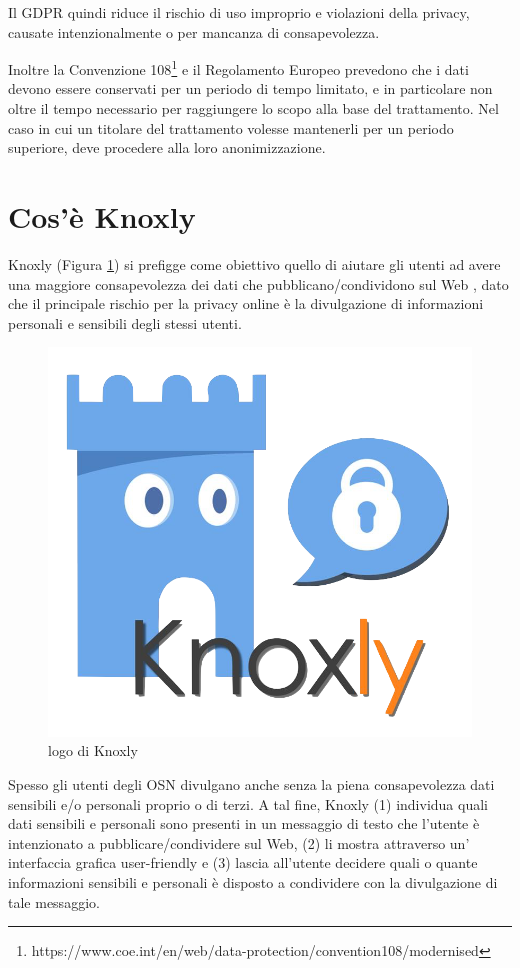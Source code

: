 Il GDPR quindi riduce il rischio di uso improprio e violazioni della privacy,
causate intenzionalmente o per mancanza di consapevolezza.

Inoltre la Convenzione 108\footnote{https://www.coe.int/en/web/data-protection/convention108/modernised} e il Regolamento Europeo prevedono che i dati devono
essere conservati per un periodo di tempo limitato, e in particolare non
oltre il tempo necessario per raggiungere lo scopo alla base del trattamento.
Nel caso in cui un titolare del trattamento volesse mantenerli per un periodo
superiore, deve procedere alla loro anonimizzazione.

\section{Cos'è Knoxly}
\label{sec:whoisKnoxly}
Knoxly (Figura \ref{fig:logoKnoxly}) si prefigge come obiettivo quello di aiutare gli utenti ad avere una maggiore consapevolezza
dei dati che pubblicano/condividono sul Web , dato che il principale rischio per la privacy online è la divulgazione di
informazioni personali e sensibili degli stessi utenti.\newline
\begin{figure}[h]
    \centering
    \includegraphics[scale=0.25]{Figure/logoKnoxly.png}
    \caption{logo di Knoxly}
    \label{fig:logoKnoxly}
\end{figure}
\FloatBarrier
Spesso gli utenti degli OSN divulgano anche senza la piena consapevolezza dati sensibili e/o personali proprio o di terzi. A tal fine, Knoxly (1) individua quali dati sensibili e personali sono presenti in un messaggio di testo che l’utente è intenzionato a pubblicare/condividere sul Web, (2) li mostra attraverso un’ interfaccia grafica user-friendly e (3) lascia all’utente decidere quali o quante informazioni sensibili e personali è disposto a condividere con la divulgazione di tale messaggio.

